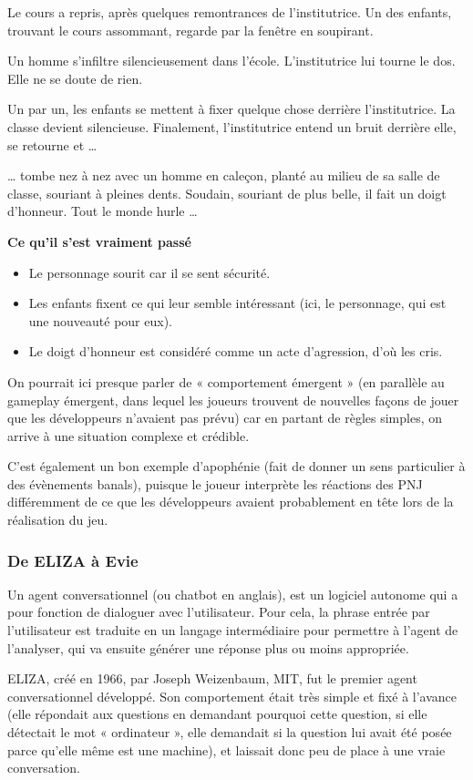 \documentclass[a4paper, 12pt]{article} %
\begin{document}
Le cours a repris, après quelques remontrances de l’institutrice. Un des enfants, trouvant le cours assommant, regarde par la fenêtre en soupirant.

Un homme s’infiltre silencieusement dans l’école. L’institutrice lui tourne le dos. Elle ne se doute de rien.

Un par un, les enfants se mettent à fixer quelque chose derrière l’institutrice. La classe devient silencieuse. Finalement, l’institutrice entend un bruit derrière elle, se retourne et …

… tombe nez à nez avec un homme en caleçon, planté au milieu de sa salle de classe, souriant à pleines dents. Soudain, souriant de plus belle, il fait un doigt d’honneur. Tout le monde hurle …

\textbf{Ce qu'il s'est vraiment passé}
\begin{itemize}
	\item Le personnage sourit car il se sent sécurité.
	\item Les enfants fixent ce qui leur semble intéressant (ici, le personnage, qui est une nouveauté pour eux).
	\item Le doigt d’honneur est considéré comme un acte d’agression, d’où les cris.
\end{itemize}	

On pourrait ici presque parler de « comportement émergent » (en parallèle au gameplay émergent, dans lequel les joueurs trouvent de nouvelles façons de jouer que les développeurs n’avaient pas prévu) car en partant de règles simples, on arrive à une situation complexe et crédible.

C’est également un bon exemple d’apophénie\cite{apophenie} (fait de donner un sens particulier à des évènements banals), puisque le joueur interprète les réactions des PNJ différemment de ce que les développeurs avaient probablement en tête lors de la réalisation du jeu. 

\newpage
\subsubsection{De ELIZA à Evie}

Un agent conversationnel (ou chatbot en anglais), est un logiciel autonome qui a pour fonction de dialoguer avec l’utilisateur. Pour cela, la phrase entrée par l’utilisateur est traduite en un langage intermédiaire pour permettre à l’agent de l’analyser, qui va ensuite générer une réponse plus ou moins appropriée.

ELIZA, créé en 1966, par Joseph Weizenbaum, MIT, fut le premier agent conversationnel développé. Son comportement était très simple et fixé à l'avance (elle répondait aux questions en demandant pourquoi cette question, si elle détectait le mot « ordinateur », elle demandait si la question lui avait été posée parce qu’elle même est une machine), et laissait donc peu de place à une vraie conversation.
\end{document}
